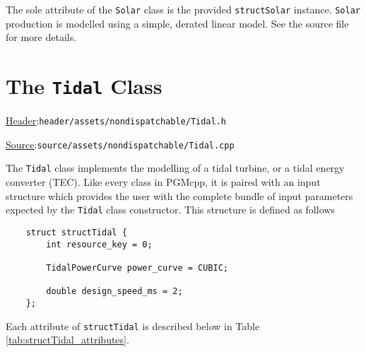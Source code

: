 \documentclass[12pt, letterpaper]{report}
\begin{document}
\noindent The sole attribute of the \texttt{Solar} class is the provided \texttt{structSolar} instance. \texttt{Solar} production is modelled using a simple, derated linear model. See the source file for more details.

\section{The \texttt{Tidal} Class}

\begin{large}
\noindent\underline{Header}:\quad\texttt{header/assets/nondispatchable/Tidal.h}\par
\noindent\underline{Source}:\quad\texttt{source/assets/nondispatchable/Tidal.cpp}\par
\end{large}
\vspace{5mm}

The \texttt{Tidal} class implements the modelling of a tidal turbine, or a tidal energy converter (TEC). Like every class in PGMcpp, it is paired with an input structure which provides the user with the complete bundle of input parameters expected by the \texttt{Tidal} class constructor. This structure is defined as follows

\begin{verbatim}
    struct structTidal {
        int resource_key = 0;
        
        TidalPowerCurve power_curve = CUBIC;
        
        double design_speed_ms = 2;
    };
\end{verbatim}

\noindent Each attribute of \texttt{structTidal} is described below in Table \ref{tab:structTidal_attributes}.

\begin{table}[H]
    \centering
    \caption{\texttt{structTidal} attribute descriptions}
    \label{tab:structTidal_attributes}
\end{table}
\end{document}
